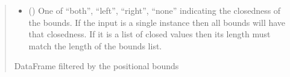 \documentclass[letterpaper,10pt,english]{sphinxmanual}
\begin{document}
\begin{fulllineitems}
\begin{quote}
\begin{description}
\begin{itemize}
\item {}
\sphinxAtStartPar
{} () \textendash{} One of “both”, “left”, “right”, “none” indicating the closedness of
the bounds. If the input is a single instance then all bounds will have
that closedness. If it is a list of closed values then its length must
match the length of the bounds list.

\end{itemize}

\sphinxAtStartPar
DataFrame filtered by the positional bounds

\sphinxAtStartPar
{}

\end{description}\end{quote}

\end{fulllineitems}

\end{document}
